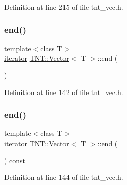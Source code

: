 Definition at line 215 of file tnt\+\_\+vec.\+h.

\mbox{\label{classTNT_1_1Vector_a3cf2f31a09a1d5b001e073a07fe13b72}} 
\subsubsection{\texorpdfstring{end()}{end()}\hspace{0.1cm}{\footnotesize\ttfamily [1/2]}}
{\footnotesize\ttfamily template$<$class T$>$ \\
\hyperlink{classTNT_1_1Vector_a7289b2334c4c28181bb4193fa32fc48a}{iterator} \hyperlink{classTNT_1_1Vector}{T\+N\+T\+::\+Vector}$<$ T $>$\+::end (\begin{DoxyParamCaption}{ }\end{DoxyParamCaption})\hspace{0.3cm}{\ttfamily [inline]}}



Definition at line 142 of file tnt\+\_\+vec.\+h.

\mbox{\label{classTNT_1_1Vector_a12286b3352a06faa1b38626ceb79c35a}} 
\subsubsection{\texorpdfstring{end()}{end()}\hspace{0.1cm}{\footnotesize\ttfamily [2/2]}}
{\footnotesize\ttfamily template$<$class T$>$ \\
\hyperlink{classTNT_1_1Vector_a7289b2334c4c28181bb4193fa32fc48a}{iterator} \hyperlink{classTNT_1_1Vector}{T\+N\+T\+::\+Vector}$<$ T $>$\+::end (\begin{DoxyParamCaption}{ }\end{DoxyParamCaption}) const\hspace{0.3cm}{\ttfamily [inline]}}



Definition at line 144 of file tnt\+\_\+vec.\+h.

\mbox{\label{classTNT_1_1Vector_a4f475be0e3634f05a058e5c10b665c62}} 

